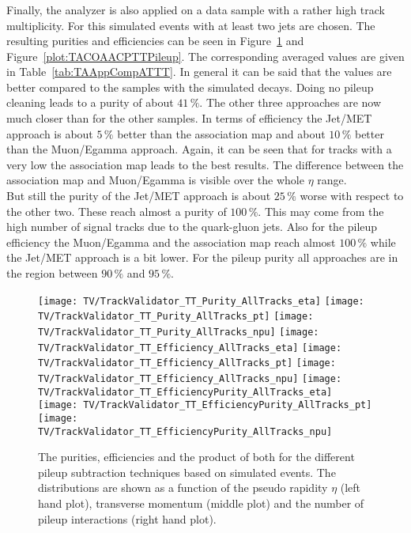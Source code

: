 

\subsubsection{\ttbar \label{sec:TASEFRDACPTT}}
Finally, the analyzer is also applied on a data sample with a rather high track multiplicity. For this simulated \ttbar events with at least two jets are chosen. The resulting purities and efficiencies can be seen in Figure~\ref{plot:TACOAACPTTSignal} and Figure~\ref{plot:TACOAACPTTPileup}. The corresponding averaged values are given in Table~\ref{tab:TAAppCompATTT}. In general it can be said that the values are better compared to the samples with the simulated \Zz decays. Doing no pileup cleaning leads to a purity of about $41\,\%$. The other three approaches are now much closer than for the other samples. In terms of efficiency the Jet/MET approach is about $5\,\%$ better than the association map and about $10\,\%$ better than the Muon/Egamma approach. Again, it can be seen that for tracks with a very low \pt the association map leads to the best results. The difference between the association map and Muon/Egamma is visible over the whole $\eta$ range. \\
But still the purity of the Jet/MET approach is about $25\,\%$ worse with respect to the other two. These reach almost a purity of $100\,\%$. This may come from the high number of signal tracks due to the quark-gluon jets. Also for the pileup efficiency the Muon/Egamma and the association map reach almost $100\,\%$ while the Jet/MET approach is a bit lower. For the pileup purity all approaches are in the region between $90\,\%$ and $95\,\%$.

\begin{figure}[h!t]
  \centering
  \texttt{[image: TV/TrackValidator\_TT\_Purity\_AllTracks\_eta]}
  \texttt{[image: TV/TrackValidator\_TT\_Purity\_AllTracks\_pt]}
  \texttt{[image: TV/TrackValidator\_TT\_Purity\_AllTracks\_npu]}
  \newline
  \texttt{[image: TV/TrackValidator\_TT\_Efficiency\_AllTracks\_eta]}
  \texttt{[image: TV/TrackValidator\_TT\_Efficiency\_AllTracks\_pt]}
  \texttt{[image: TV/TrackValidator\_TT\_Efficiency\_AllTracks\_npu]}
  \newline
  \texttt{[image: TV/TrackValidator\_TT\_EfficiencyPurity\_AllTracks\_eta]}
  \texttt{[image: TV/TrackValidator\_TT\_EfficiencyPurity\_AllTracks\_pt]}
  \texttt{[image: TV/TrackValidator\_TT\_EfficiencyPurity\_AllTracks\_npu]}
  \caption[Purity, efficiency and their product for the different pileup subtraction techniques based on simulated \ttbar events]{The purities, efficiencies and the product of both for the different pileup subtraction techniques based on simulated \ttbar events. The distributions are shown as a function of the pseudo rapidity $\eta$ (left hand plot), transverse momentum (middle plot) and the number of pileup interactions (right hand plot). \label{plot:TACOAACPTTSignal}}
\end{figure}

